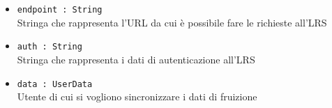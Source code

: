\documentclass[../Tesi.tex]{subfiles}
\begin{document}
\begin{description}
\begin{itemize}
\begin{description}
\begin{itemize}
						\item \texttt{endpoint : String}\\
						Stringa che rappresenta l'URL da cui è possibile fare le richieste all'LRS

						\item \texttt{auth : String}\\
						Stringa che rappresenta i dati di autenticazione all'LRS

						\item \texttt{data : UserData}\\
						Utente di cui si vogliono sincronizzare i dati di fruizione
					\end{itemize}
				\end{description}

			\end{itemize}
		\end{description}
\end{document}
